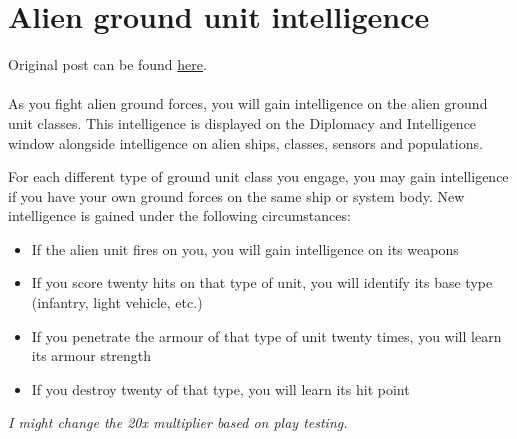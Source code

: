 \documentclass[../../Aurora C# unofficial manual.tex]{subfiles}
\begin{document}
	\section{Alien ground unit intelligence}\label{alien_ground_unit_intelligence}
	Original post can be found
	\href{http://aurora2.pentarch.org/index.php?topic=8495.msg116121#msg116121}{here}.
	\\\\
	
	As you fight alien ground forces, you will gain intelligence on the alien ground unit classes. This intelligence is displayed on the Diplomacy and Intelligence window alongside intelligence on alien ships, classes, sensors and populations.
	
	For each different type of ground unit class you engage, you may gain intelligence if you have your own ground forces on the same ship or system body. New intelligence is gained under the following circumstances:
	\begin{itemize}
		\item If the alien unit fires on you, you will gain intelligence on its weapons
		\item If you score twenty hits on that type of unit, you will identify its base type (infantry, light vehicle, etc.)
		\item If you penetrate the armour of that type of unit twenty times, you will learn its armour strength
		\item If you destroy twenty of that type, you will learn its hit point
	\end{itemize}
	\textit{I might change the 20x multiplier based on play testing.}
\end{document}
